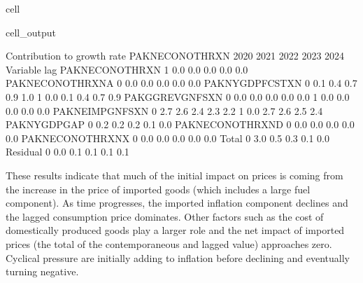 \documentclass[letterpaper,10pt,english]{jupyterBook}
\begin{document}
\begin{sphinxuseclass}{cell}
\begin{sphinxVerbatimOutput}
\begin{sphinxuseclass}{cell_output}
\begin{sphinxVerbatim}[commandchars=\\\{\}]
 Contribution to growth rate PAKNECONOTHRXN
                            2020        2021        2022        2023        2024
Variable         lag                                                            
PAKNECONOTHRXN   \PYGZhy{}1        \PYGZhy{}0.0\PYGZpc{}       \PYGZhy{}0.0\PYGZpc{}       \PYGZhy{}0.0\PYGZpc{}       \PYGZhy{}0.0\PYGZpc{}       \PYGZhy{}0.0\PYGZpc{}
PAKNECONOTHRXN\PYGZus{}A  0        \PYGZhy{}0.0\PYGZpc{}       \PYGZhy{}0.0\PYGZpc{}       \PYGZhy{}0.0\PYGZpc{}       \PYGZhy{}0.0\PYGZpc{}       \PYGZhy{}0.0\PYGZpc{}
PAKNYGDPFCSTXN    0         0.1\PYGZpc{}        0.4\PYGZpc{}        0.7\PYGZpc{}        0.9\PYGZpc{}        1.0\PYGZpc{}
                 \PYGZhy{}1        \PYGZhy{}0.0\PYGZpc{}       \PYGZhy{}0.1\PYGZpc{}       \PYGZhy{}0.4\PYGZpc{}       \PYGZhy{}0.7\PYGZpc{}       \PYGZhy{}0.9\PYGZpc{}
PAKGGREVGNFSXN    0        \PYGZhy{}0.0\PYGZpc{}       \PYGZhy{}0.0\PYGZpc{}       \PYGZhy{}0.0\PYGZpc{}       \PYGZhy{}0.0\PYGZpc{}       \PYGZhy{}0.0\PYGZpc{}
                 \PYGZhy{}1        \PYGZhy{}0.0\PYGZpc{}       \PYGZhy{}0.0\PYGZpc{}       \PYGZhy{}0.0\PYGZpc{}       \PYGZhy{}0.0\PYGZpc{}       \PYGZhy{}0.0\PYGZpc{}
PAKNEIMPGNFSXN    0         2.7\PYGZpc{}        2.6\PYGZpc{}        2.4\PYGZpc{}        2.3\PYGZpc{}        2.2\PYGZpc{}
                 \PYGZhy{}1        \PYGZhy{}0.0\PYGZpc{}       \PYGZhy{}2.7\PYGZpc{}       \PYGZhy{}2.6\PYGZpc{}       \PYGZhy{}2.5\PYGZpc{}       \PYGZhy{}2.4\PYGZpc{}
PAKNYGDPGAP\PYGZus{}      0         0.2\PYGZpc{}        0.2\PYGZpc{}        0.2\PYGZpc{}        0.1\PYGZpc{}        0.0\PYGZpc{}
PAKNECONOTHRXN\PYGZus{}D  0        \PYGZhy{}0.0\PYGZpc{}       \PYGZhy{}0.0\PYGZpc{}       \PYGZhy{}0.0\PYGZpc{}       \PYGZhy{}0.0\PYGZpc{}       \PYGZhy{}0.0\PYGZpc{}
PAKNECONOTHRXN\PYGZus{}X  0        \PYGZhy{}0.0\PYGZpc{}       \PYGZhy{}0.0\PYGZpc{}       \PYGZhy{}0.0\PYGZpc{}       \PYGZhy{}0.0\PYGZpc{}       \PYGZhy{}0.0\PYGZpc{}
Total             0         3.0\PYGZpc{}        0.5\PYGZpc{}        0.3\PYGZpc{}        0.1\PYGZpc{}       \PYGZhy{}0.0\PYGZpc{}
Residual          0         0.0\PYGZpc{}       \PYGZhy{}0.1\PYGZpc{}       \PYGZhy{}0.1\PYGZpc{}       \PYGZhy{}0.1\PYGZpc{}       \PYGZhy{}0.1\PYGZpc{}
\end{sphinxVerbatim}

\end{sphinxuseclass}\end{sphinxVerbatimOutput}

\end{sphinxuseclass}
\sphinxAtStartPar
These results indicate that much of the initial impact on prices is coming from the increase in the price of imported goods (which includes a large fuel component). As time progresses, the imported inflation component declines and the lagged consumption price dominates.  Other factors such as the cost of domestically produced goods play a larger role and the net impact of imported prices (the total of the contemporaneous and lagged value) approaches zero. Cyclical pressure are initially adding to inflation before declining and eventually turning negative.
\end{document}
